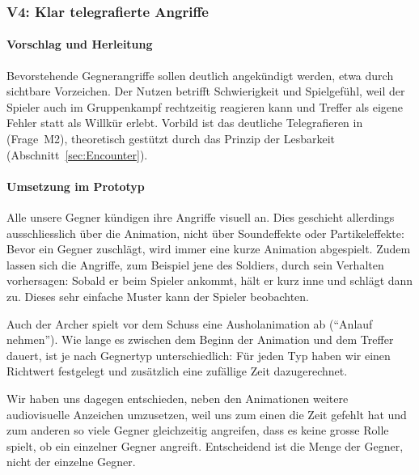 \documentclass[../Main.tex]{subfiles}
\begin{document}
\subsubsection{V4: Klar telegrafierte Angriffe} \label{sec:V4}

\paragraph{Vorschlag und Herleitung}
Bevorstehende Gegnerangriffe sollen deutlich angekündigt werden, etwa durch sichtbare Vorzeichen. Der Nutzen betrifft Schwierigkeit und Spielgefühl, weil der Spieler auch im Gruppenkampf rechtzeitig reagieren kann und Treffer als eigene Fehler statt als Willkür erlebt. Vorbild ist das deutliche Telegrafieren in  (Frage~M2), theoretisch gestützt durch das Prinzip der Lesbarkeit (Abschnitt~\ref{sec:Encounter}).

\paragraph{Umsetzung im Prototyp}
Alle unsere Gegner kündigen ihre Angriffe visuell an. Dies geschieht allerdings ausschliesslich über die Animation, nicht über Soundeffekte oder Partikeleffekte: Bevor ein Gegner zuschlägt, wird immer eine kurze Animation abgespielt. Zudem lassen sich die Angriffe, zum Beispiel jene des Soldiers, durch sein Verhalten vorhersagen: Sobald er beim Spieler ankommt, hält er kurz inne und schlägt dann zu. Dieses sehr einfache Muster kann der Spieler beobachten.

Auch der Archer spielt vor dem Schuss eine Ausholanimation ab (\enquote{Anlauf nehmen}). Wie lange es zwischen dem Beginn der Animation und dem Treffer dauert, ist je nach Gegnertyp unterschiedlich: Für jeden Typ haben wir einen Richtwert festgelegt und zusätzlich eine zufällige Zeit dazugerechnet.

Wir haben uns dagegen entschieden, neben den Animationen weitere audiovisuelle Anzeichen umzusetzen, weil uns zum einen die Zeit gefehlt hat und zum anderen so viele Gegner gleichzeitig angreifen, dass es keine grosse Rolle spielt, ob ein einzelner Gegner angreift. Entscheidend ist die Menge der Gegner, nicht der einzelne Gegner.
\end{document}
